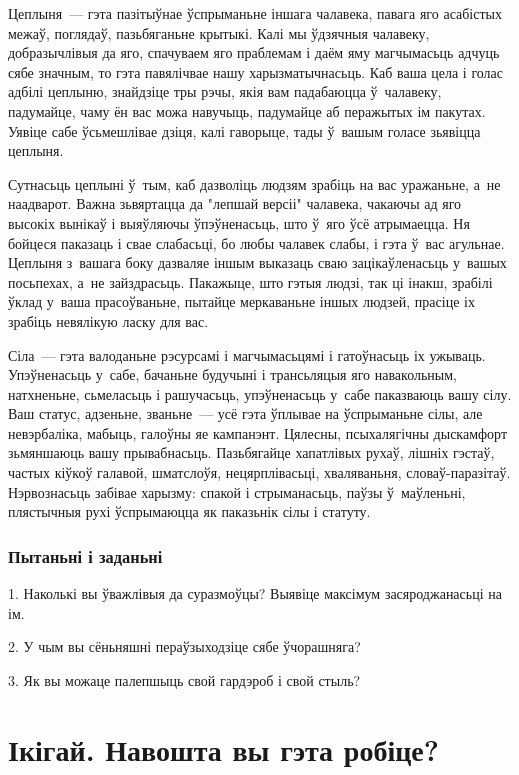 Цеплыня~--- гэта пазітыўнае ўспрыманьне іншага чалавека, павага яго асабістых межаў, поглядаў, пазьбяганьне крытыкі. Калі мы ўдзячныя чалавеку, добразычлівыя да яго, спачуваем яго праблемам і даём яму магчымасьць адчуць сябе значным, то гэта павялічвае нашу харызматычнасьць. Каб ваша цела і голас адбілі цеплыню, знайдзіце тры рэчы, якія вам падабаюцца ў~чалавеку, падумайце, чаму ён вас можа навучыць, падумайце аб перажытых ім пакутах. Уявіце сабе ўсьмешлівае дзіця, калі гаворыце, тады ў~вашым голасе зьявіцца цеплыня.

Сутнасьць цеплыні ў~тым, каб дазволіць людзям зрабіць на вас уражаньне, а~не наадварот. Важна зьвяртацца да "лепшай версіі" чалавека, чакаючы ад яго высокіх вынікаў і выяўляючы ўпэўненасьць, што ў~яго ўсё атрымаецца. Ня бойцеся паказаць і свае слабасьці, бо любы чалавек слабы, і гэта ў~вас агульнае. Цеплыня з~вашага боку дазваляе іншым выказаць сваю зацікаўленасьць у~вашых посьпехах, а~не зайздрасьць. Пакажыце, што гэтыя людзі, так ці інакш, зрабілі ўклад у~ваша прасоўваньне, пытайце меркаваньне іншых людзей, прасіце іх зрабіць невялікую ласку для вас.

Сіла~--- гэта валоданьне рэсурсамі і магчымасьцямі і гатоўнасьць іх ужываць. Упэўненасьць у~сабе, бачаньне будучыні і трансьляцыя яго навакольным, натхненьне, сьмеласьць і рашучасьць, упэўненасьць у~сабе паказваюць вашу сілу. Ваш статус, адзеньне, званьне~--- усё гэта ўплывае на ўспрыманьне сілы, але невэрбаліка, мабыць, галоўны яе кампанэнт. Цялесны, псыхалягічны дыскамфорт зьмяншаюць вашу прывабнасьць. Пазьбягайце хапатлівых рухаў, лішніх гэстаў, частых кіўкоў галавой, шматслоўя, нецярплівасьці, хваляваньня, словаў-паразітаў. Нэрвознасьць забівае харызму: спакой і стрыманасьць, паўзы ў~маўленьні, плястычныя рухі ўспрымаюцца як паказьнік сілы і статуту.

\subsubsection{Пытаньні і заданьні}

1. Наколькі вы ўважлівыя да суразмоўцы? Выявіце максімум засяроджанасьці на ім.

2. У чым вы сёньняшні пераўзыходзіце сябе ўчорашняга?

3. Як вы можаце палепшыць свой гардэроб і свой стыль?


\section{Ікігай. Навошта вы гэта робіце?}

